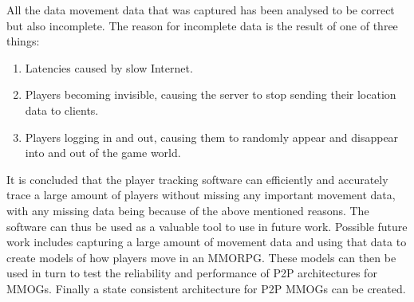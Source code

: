 
All the data movement data that was captured has been analysed to be correct but also incomplete. The reason for incomplete data is the result of one of three things:

\begin{enumerate}
	\item Latencies caused by slow Internet.
	\item Players becoming invisible, causing the server to stop sending their location data to clients.
	\item Players logging in and out, causing them to randomly appear and disappear into and out of the game world.
\end{enumerate}



It is concluded that the player tracking software can efficiently and accurately trace a large amount of players without missing any important movement data, with any missing data being because of the above mentioned reasons. The software can thus be used as a valuable tool to use in future work. Possible future work includes capturing a large amount of movement data and using that data to create models of how players move in an MMORPG. These models can then be used in turn to test the reliability and performance of P2P architectures for MMOGs. Finally a state consistent architecture for P2P MMOGs can be created. 


